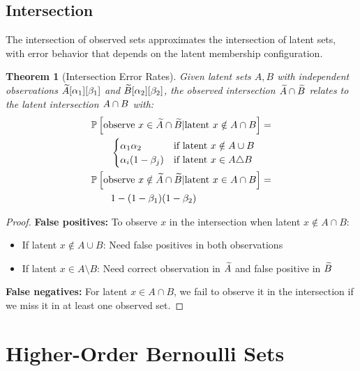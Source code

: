 \documentclass[11pt,final,hidelinks]{article}
\newtheorem{theorem}{Theorem}[section]
\begin{document}
\subsection{Intersection}

The intersection of observed sets approximates the intersection of latent sets, with error behavior that depends on the latent membership configuration.

\begin{theorem}[Intersection Error Rates]
Given latent sets $A, B$ with independent observations $\widetilde{A}[\alpha_1][\beta_1]$ and $\widetilde{B}[\alpha_2][\beta_2]$, the observed intersection $\widetilde{A} \cap \widetilde{B}$ relates to the latent intersection $A \cap B$ with:
\begin{align}
&\mathbb{P}\left[\text{observe } x \in \widetilde{A} \cap \widetilde{B} | \text{latent } x \notin A \cap B\right] = \\
&\qquad\begin{cases}
\alpha_1 \alpha_2 & \text{if latent } x \notin A \cup B \\
\alpha_i(1-\beta_j) & \text{if latent } x \in A \triangle B
\end{cases} \\
&\mathbb{P}\left[\text{observe } x \notin \widetilde{A} \cap \widetilde{B} | \text{latent } x \in A \cap B\right] = \\
&\qquad 1 - (1-\beta_1)(1-\beta_2)
\end{align}
\end{theorem}

\begin{proof}
\textbf{False positives:} To observe $x$ in the intersection when latent $x \notin A \cap B$:
\begin{itemize}
    \item If latent $x \notin A \cup B$: Need false positives in both observations
    \item If latent $x \in A \setminus B$: Need correct observation in $\widetilde{A}$ and false positive in $\widetilde{B}$
\end{itemize}

\textbf{False negatives:} For latent $x \in A \cap B$, we fail to observe it in the intersection if we miss it in at least one observed set.
\end{proof}

\section{Higher-Order Bernoulli Sets}
\end{document}
